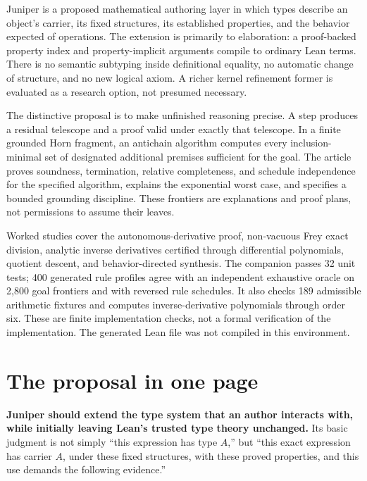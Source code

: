 \documentclass[11pt,a4paper]{article}
\theoremstyle{definition}\newtheorem{definition}[theorem]{Definition}
\theoremstyle{remark}\newtheorem{remark}[theorem]{Remark}
\begin{document}
Juniper is a proposed mathematical authoring layer in which types describe an object's carrier, its fixed structures, its established properties, and the behavior expected of operations. The extension is primarily to elaboration: a proof-backed property index and property-implicit arguments compile to ordinary Lean terms. There is no semantic subtyping inside definitional equality, no automatic change of structure, and no new logical axiom. A richer kernel refinement former is evaluated as a research option, not presumed necessary.

The distinctive proposal is to make unfinished reasoning precise. A step produces a residual telescope and a proof valid under exactly that telescope. In a finite grounded Horn fragment, an antichain algorithm computes every inclusion-minimal set of designated additional premises sufficient for the goal. The article proves soundness, termination, relative completeness, and schedule independence for the specified algorithm, explains the exponential worst case, and specifies a bounded grounding discipline. These frontiers are explanations and proof plans, not permissions to assume their leaves.

Worked studies cover the autonomous-derivative proof, non-vacuous Frey exact division, analytic inverse derivatives certified through differential polynomials, quotient descent, and behavior-directed synthesis. The companion passes 32 unit tests; 400 generated rule profiles agree with an independent exhaustive oracle on 2,800 goal frontiers and with reversed rule schedules. It also checks 189 admissible arithmetic fixtures and computes inverse-derivative polynomials through order six. These are finite implementation checks, not a formal verification of the implementation. The generated Lean file was not compiled in this environment.

\begingroup\small\setlength{\parskip}{0pt}
\tableofcontents
\endgroup
\clearpage

\section{The proposal in one page}
\label{sec:proposal}
\textbf{Juniper should extend the type system that an author interacts with, while initially leaving Lean's trusted type theory unchanged.} Its basic judgment is not simply ``this expression has type $A$,'' but ``this exact expression has carrier $A$, under these fixed structures, with these proved properties, and this use demands the following evidence.''
\end{document}
